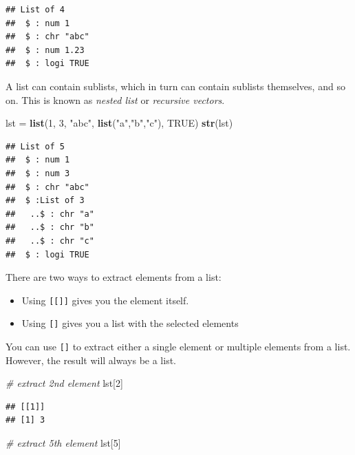 \documentclass[
]{book}
\newenvironment{Shaded}{\begin{snugshade}}{\end{snugshade}}
\newcommand{\CommentTok}[1]{\textcolor[rgb]{0.56,0.35,0.01}{\textit{#1}}}
\newcommand{\DecValTok}[1]{\textcolor[rgb]{0.00,0.00,0.81}{#1}}
\newcommand{\KeywordTok}[1]{\textcolor[rgb]{0.13,0.29,0.53}{\textbf{#1}}}
\newcommand{\NormalTok}[1]{#1}
\newcommand{\OtherTok}[1]{\textcolor[rgb]{0.56,0.35,0.01}{#1}}
\newcommand{\StringTok}[1]{\textcolor[rgb]{0.31,0.60,0.02}{#1}}
\providecommand{\tightlist}{%
  \setlength{\itemsep}{0pt}\setlength{\parskip}{0pt}}
\begin{document}
\begin{verbatim}
## List of 4
##  $ : num 1
##  $ : chr "abc"
##  $ : num 1.23
##  $ : logi TRUE
\end{verbatim}

A list can contain sublists, which in turn can contain sublists themselves, and so on. This is known as \emph{nested list} or \emph{recursive vectors}.

\begin{Shaded}
\begin{Highlighting}[]
\NormalTok{lst =}\StringTok{ }\KeywordTok{list}\NormalTok{(}\DecValTok{1}\NormalTok{, }\DecValTok{3}\NormalTok{, }\StringTok{"abc"}\NormalTok{, }\KeywordTok{list}\NormalTok{(}\StringTok{"a"}\NormalTok{,}\StringTok{"b"}\NormalTok{,}\StringTok{"c"}\NormalTok{), }\OtherTok{TRUE}\NormalTok{)}
\KeywordTok{str}\NormalTok{(lst)}
\end{Highlighting}
\end{Shaded}

\begin{verbatim}
## List of 5
##  $ : num 1
##  $ : num 3
##  $ : chr "abc"
##  $ :List of 3
##   ..$ : chr "a"
##   ..$ : chr "b"
##   ..$ : chr "c"
##  $ : logi TRUE
\end{verbatim}

There are two ways to extract elements from a list:

\begin{itemize}
\tightlist
\item
  Using \texttt{{[}{[}{]}{]}} gives you the element itself.
\item
  Using \texttt{{[}{]}} gives you a list with the selected elements
\end{itemize}

You can use \texttt{{[}{]}} to extract either a single element or multiple elements from a list. However, the result will always be a list.

\begin{Shaded}
\begin{Highlighting}[]
\CommentTok{# extract 2nd element}
\NormalTok{lst[}\DecValTok{2}\NormalTok{]}
\end{Highlighting}
\end{Shaded}

\begin{verbatim}
## [[1]]
## [1] 3
\end{verbatim}

\begin{Shaded}
\begin{Highlighting}[]
\CommentTok{# extract 5th element}
\NormalTok{lst[}\DecValTok{5}\NormalTok{]}
\end{Highlighting}
\end{Shaded}
\end{document}
